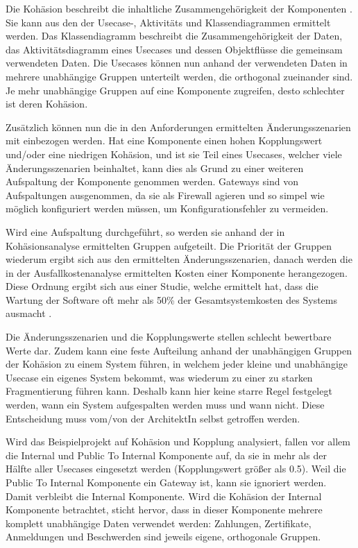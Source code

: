 Die Kohäsion beschreibt die inhaltliche Zusammengehörigkeit der Komponenten \cite[S. 164]{effektiv}. Sie kann aus den der Usecase-, Aktivitäts und Klassendiagrammen ermittelt werden. Das Klassendiagramm beschreibt die Zusammengehörigkeit der Daten, das Aktivitätsdiagramm eines Usecases und dessen Objektflüsse die gemeinsam verwendeten Daten. Die Usecases können nun anhand der verwendeten Daten in mehrere unabhängige Gruppen unterteilt werden, die orthogonal zueinander sind. Je mehr unabhängige Gruppen auf eine Komponente zugreifen, desto schlechter ist deren Kohäsion.

Zusätzlich können nun die in den Anforderungen ermittelten Änderungsszenarien mit einbezogen werden. Hat eine Komponente einen hohen Kopplungswert und/oder eine niedrigen Kohäsion, und ist sie Teil eines Usecases, welcher viele Änderungsszenarien beinhaltet, kann dies als Grund zu einer weiteren Aufspaltung der Komponente genommen werden. Gateways sind von Aufspaltungen ausgenommen, da sie als Firewall agieren und so simpel wie möglich konfiguriert werden müssen, um Konfigurationsfehler zu vermeiden.

Wird eine Aufspaltung durchgeführt, so werden sie anhand der in Kohäsionsanalyse ermittelten Gruppen aufgeteilt. Die Priorität der Gruppen wiederum ergibt sich aus den ermittelten Änderungsszenarien, danach werden die in der Ausfallkostenanalyse ermittelten Kosten einer Komponente herangezogen. Diese Ordnung ergibt sich aus einer Studie, welche ermittelt hat, dass die Wartung der Software oft mehr als 50\% der Gesamtsystemkosten des Systems ausmacht \cite[S. 71-84]{maincost}.

Die Änderungsszenarien und die Kopplungswerte stellen schlecht bewertbare Werte dar. Zudem kann eine feste Aufteilung anhand der unabhängigen Gruppen der Kohäsion zu einem System führen, in welchem jeder kleine und unabhängige Usecase ein eigenes System bekommt, was wiederum zu einer zu starken Fragmentierung führen kann. Deshalb kann hier keine starre Regel festgelegt werden, wann ein System aufgespalten werden muss und wann nicht. Diese Entscheidung muss vom/von der ArchitektIn selbst getroffen werden.

Wird das Beispielprojekt auf Kohäsion und Kopplung analysiert, fallen vor allem die Internal und Public To Internal Komponente auf, da sie in mehr als der Hälfte aller Usecases eingesetzt werden (Kopplungswert größer als 0.5). Weil die Public To Internal Komponente ein Gateway ist, kann sie ignoriert werden. Damit verbleibt die Internal Komponente. Wird die Kohäsion der Internal Komponente betrachtet, sticht hervor, dass in dieser Komponente mehrere komplett unabhängige Daten verwendet werden: Zahlungen, Zertifikate, Anmeldungen und Beschwerden sind jeweils eigene, orthogonale Gruppen.

